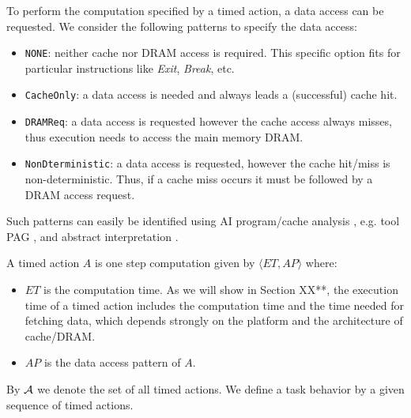 To perform the computation specified by a timed action, a data access can be requested. We consider the following patterns to specify the data access:

\begin{itemize}
\item \texttt{NONE}: neither cache nor DRAM access is required. This specific option fits for particular instructions like \textit{Exit}, \textit{Break}, etc.
\item \texttt{CacheOnly}: a data access is needed and always leads a (successful) cache hit.
\item \texttt{DRAMReq}: a data access is requested however the cache access always misses, thus execution needs to access the main memory DRAM.   
\item \texttt{NonDterministic}: a data access is requested, however the cache hit/miss is non-deterministic. Thus, if a cache miss occurs it must be followed by a DRAM access request.
\end{itemize}

Such patterns can easily be identified using AI program/cache analysis \cite{Ferdinand1999}, e.g. tool PAG \cite{PAG}, and abstract interpretation \cite{Wang2010}.

\begin{definition} \label{def:Act}
 A timed action $A$ is one step computation given by $\langle ET, AP\rangle$ where:
\begin{itemize}
\item $ET$ is the computation time. As we will show in Section XX**, the execution time of a timed action includes the computation time and the time needed for fetching data, which depends strongly on the platform and the architecture of cache/DRAM. 
\item $AP$ is the data access pattern of $A$. 
\end{itemize} 
\end{definition}
By $\cal{A}$ we denote the set of all timed actions. We define a task behavior by a given sequence of timed actions.


 
